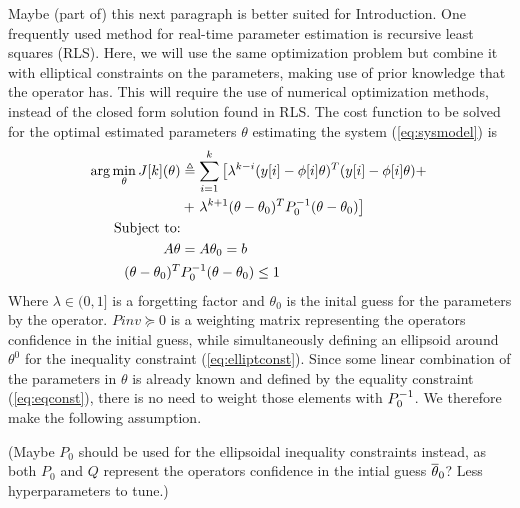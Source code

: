 {\color{red}Maybe (part of) this next paragraph is better suited for Introduction.}
One frequently used method for real-time parameter estimation is recursive least squares
(RLS)\cite{astrom_adaptive_2008}. Here, we will use the same optimization problem but
combine it with elliptical constraints on the parameters, making use of prior knowledge
that the operator has. This will require the use of numerical optimization methods, instead 
of the closed form solution found in RLS. The cost function to be solved for the optimal
estimated parameters $\theta$ estimating the system (\ref{eq:sysmodel}) is
\begin{align}
        \arg\min\limits_{\theta} J[k](\theta) &\triangleq
            \sum\limits_{i=1}^k \left[
            \lambda^{k-i}(y[i]-\phi[i]\theta)^T(y[i]-\phi[i]\theta) + \right. \notag \\
            &+ \left. \lambda^{k+1}(\theta-\theta_0)^TP_0^{-1}(\theta-\theta_0) \right]
    \label{eq:costfunction} \\
    \text{Subject to:}& \notag \\
    A\theta &= A\theta_0 = b
    \label{eq:eqconst} \\
    (\theta-\theta_0)^T&P_0^{-1}(\theta-\theta_0) \leq 1
    \label{eq:elliptconst}
\end{align}
Where $\lambda \in (0,1]$ is a forgetting factor and $\theta_0$
is the inital guess for the parameters
by the operator. $Pinv \succeq 0$ is a weighting matrix representing the
operators confidence in the initial guess, while simultaneously defining an
ellipsoid around $\theta^0$ for the
inequality constraint (\ref{eq:elliptconst}). Since some linear combination
of the parameters in $\theta$ is already known and defined by the equality constraint
(\ref{eq:eqconst}), there is no need to weight those elements with $P_0^{-1}$. We therefore
make the following assumption.

{\color{red}(Maybe $P_0$ should be used for the ellipsoidal inequality constraints
instead, as both $P_0$ and $Q$ represent the operators confidence in the intial guess
$\overline{\theta}_0$? Less hyperparameters to tune.)}

